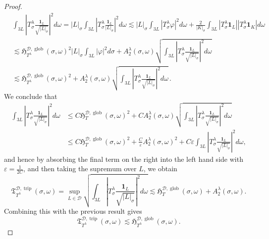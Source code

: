 \documentclass{amsart}%
\theoremstyle{plain}
\numberwithin{equation}{section}
\begin{document}
\begin{proof}
\begin{align}
&  \int_{3L}\left\vert T_{\sigma}^{\lambda}\frac{\mathbf{1}_{L}}%
{\sqrt{\left\vert L\right\vert _{\sigma}}}\right\vert ^{2}d\omega=\left\vert
L\right\vert _{\sigma}\int_{3L}\left\vert T_{\sigma}^{\lambda}\frac
{\mathbf{1}_{L}}{\left\vert L\right\vert _{\sigma}}\right\vert ^{2}%
d\omega\lesssim\left\vert L\right\vert _{\sigma}\int_{3L}\left\vert T_{\sigma
}^{\lambda}\varphi\right\vert ^{2}d\omega+\frac{2}{\left\vert K\right\vert
_{\sigma}}\int_{3L}\left\vert T_{\sigma}^{\lambda}\mathbf{1}_{L}\right\vert
\left\vert T_{\sigma}^{\lambda}\mathbf{1}_{K}\right\vert d\omega
\label{eq:init_interval_to_Haar_bd}\\
&  \lesssim\mathfrak{H}_{T^{\lambda}}^{\mathcal{D},\operatorname*{glob}%
}\left(  \sigma,\omega\right)  ^{2}\left\vert L\right\vert _{\sigma}\int
_{3L}\left\vert \varphi\right\vert ^{2}d\sigma+A_{2}^{\lambda}\left(
\sigma,\omega\right)  \sqrt{\int_{3L}\left\vert T_{\sigma}^{\lambda}%
\frac{\mathbf{1}_{L}}{\sqrt{\left\vert L\right\vert _{\sigma}}}\right\vert
^{2}d\omega}\nonumber\\
&  \lesssim\mathfrak{H}_{T^{\lambda}}^{\mathcal{D},\operatorname*{glob}%
}\left(  \sigma,\omega\right)  ^{2}+A_{2}^{\lambda}\left(  \sigma
,\omega\right)  \sqrt{\int_{3L}\left\vert T_{\sigma}^{\lambda}\frac
{\mathbf{1}_{L}}{\sqrt{\left\vert L\right\vert _{\sigma}}}\right\vert
^{2}d\omega}\,.\nonumber
\end{align}
We conclude that%
\begin{align*}
\int_{3L}\left\vert T_{\sigma}^{\lambda}\frac{\mathbf{1}_{L}}{\sqrt{\left\vert
L\right\vert _{\sigma}}}\right\vert ^{2}d\omega & \leq C\mathfrak{H}%
_{T}^{\mathcal{D},\operatorname*{glob}}\left(  \sigma,\omega\right)
^{2}+CA_{2}^{\lambda}\left(  \sigma,\omega\right)  \sqrt{\int_{3L}\left\vert
T_{\sigma}^{\lambda}\frac{\mathbf{1}_{L}}{\sqrt{\left\vert L\right\vert
_{\sigma}}}\right\vert ^{2}d\omega}\\
& \leq C\mathfrak{H}_{T}^{\mathcal{D},\operatorname*{glob}}\left(
\sigma,\omega\right)  ^{2}+\frac{C}{\varepsilon}A_{2}^{\lambda}\left(
\sigma,\omega\right)  ^{2}+C\varepsilon\int_{3L}\left\vert T_{\sigma}%
^{\lambda}\frac{\mathbf{1}_{L}}{\sqrt{\left\vert L\right\vert _{\sigma}}%
}\right\vert ^{2}d\omega,
\end{align*}
and hence by absorbing the final term on the right into the left hand side
with $\varepsilon=\frac{1}{2C}$, and then taking the supremum over $L$, we
obtain
\[
\mathfrak{T}_{T^{\lambda}}^{\mathcal{D},\operatorname*{trip}}\left(
\sigma,\omega\right)  =\sup_{L\in\mathcal{D}}\sqrt{\int_{3L}\left\vert
T_{\sigma}^{\lambda}\frac{\mathbf{1}_{L}}{\sqrt{\left\vert L\right\vert
_{\sigma}}}\right\vert ^{2}d\omega}\lesssim\mathfrak{H}_{T}^{\mathcal{D}%
,\operatorname*{glob}}\left(  \sigma,\omega\right)  +A_{2}^{\lambda}\left(
\sigma,\omega\right)  .
\]
Combining this with the previous result gives%
\[
\mathfrak{T}_{T^{\lambda}}^{\mathcal{D},\operatorname*{trip}}\left(
\sigma,\omega\right)  \lesssim\mathfrak{H}_{T^{\lambda}}^{\mathcal{D}%
,\operatorname*{glob}}\left(  \sigma,\omega\right)  .
\]

\end{proof}
\end{document}
